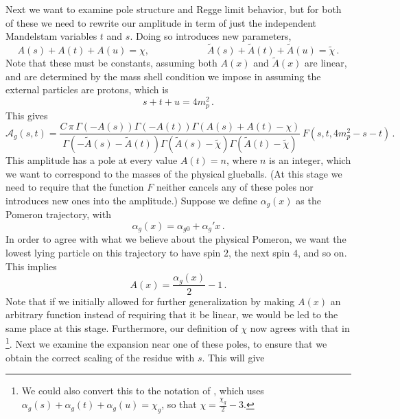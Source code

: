 \documentclass[aps, prd, preprintnumbers, floatfix, showpacs, showkeys, nofootinbib, 10pt]{revtex4-1}
\def\beq{\begin{equation}}
\def\eeq{\end{equation}}
\begin{document}
Next we want to examine pole structure and Regge limit behavior, but for both of these we need to rewrite our amplitude in term of just the independent Mandelstam variables $t$ and $s$.  Doing so introduces new parameters, 
\beq
A(s) + A(t) + A(u) = \chi, \hspace{1in} \tilde{A}(s) + \tilde{A}(t) + \tilde{A}(u) = \tilde{\chi} \, .
\eeq
Note that these must be constants, assuming both $A(x)$ and $\tilde{A}(x)$ are linear, and are determined by the mass shell condition we impose in assuming the external particles are protons, which is
\beq
\label{eqn:msprotons}
s + t + u = 4m_p^2 \, .
\eeq
This gives
\beq
\label{eqn:VSgts}
\mathcal{A}_g(s, t) = \frac{C \, \pi \, \Gamma\left(-A(s)\right)\Gamma\left(-A(t)\right)\Gamma\left(A(s) + A(t) - \chi\right)}{\Gamma\left(-\tilde{A}(s) - \tilde{A}(t)\right)\Gamma\left(\tilde{A}(s) - \tilde{\chi}\right)\Gamma\left(\tilde{A}(t) - \tilde{\chi}\right)} \, F(s, t, 4m_p^2 - s - t) \, .
\eeq
This amplitude has a pole at every value $A(t) = n$, where $n$ is an integer, which we want to correspond to the masses of the physical glueballs.  (At this stage we need to require that the function $F$ neither cancels any of these poles nor introduces new ones into the amplitude.)  Suppose we define $\alpha_g(x)$ as the Pomeron trajectory, with
\beq
\alpha_g(x) = \alpha_{g0} + \alpha_g'x \, .
\eeq
In order to agree with what we believe about the physical Pomeron, we want the lowest lying particle on this trajectory to have spin $2$, the next spin $4$, and so on.  This implies
\beq
A(x) = \frac{\alpha_g(x)}{2} - 1 \, .
\eeq
Note that if we initially allowed for further generalization by making $A(x)$ an arbitrary function instead of requiring that it be linear, we would be led to the same place at this stage.  Furthermore, our definition of $\chi$ now agrees with that in \cite{DHM}\footnote{We could also convert this to the notation of \cite{ADM}, which uses $\alpha_g(s) + \alpha_g(t) + \alpha_g(u) = \chi_g$, so that $\chi = \frac{\chi_g}{2} - 3$.}.  Next we examine the expansion near one of these poles, to ensure that we obtain the correct scaling of the residue with $s$.  This will give
\end{document}

